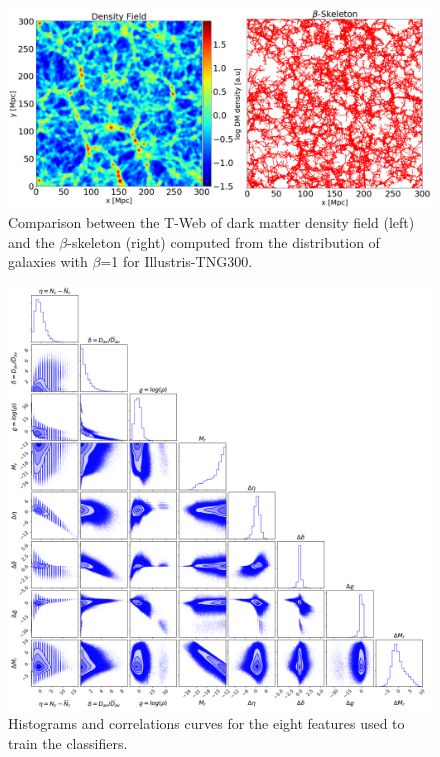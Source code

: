 \documentclass[usenatbib]{mnras}
\begin{document}
\begin{figure}
\centering
 \includegraphics[scale=0.28]{Figs/Fig1_.png}%
 \caption{Comparison between the T-Web of dark matter density field
   (left) and the $\beta$-skeleton (right) computed from the
   distribution of galaxies with $\beta$=1 for Illustris-TNG300.}  
 \label{fig:TWebBsk}
\end{figure}


\begin{figure}
        \includegraphics[scale=0.37]{Figs/p_all_features_correlations.pdf}
    \caption{Histograms and correlations curves for the eight features
      used to train the classifiers.}  
    \label{fig:features}
\end{figure}
\end{document}
